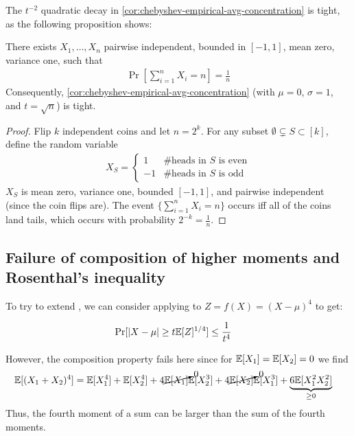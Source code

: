 The $t^{-2}$ quadratic decay in \cref{cor:chebyshev-empirical-avg-concentration} is tight, as the following
proposition shows:
\begin{proposition}
    There exists $X_1, \ldots, X_n$ pairwise independent, bounded in $[-1, 1]$, mean zero, variance one, such that
    \begin{align}
        \Pr\left[\sum_{i=1}^n X_i = n \right] = \frac{1}{n}
    \end{align}
    Consequently, \cref{cor:chebyshev-empirical-avg-concentration} (with $\mu=0$, $\sigma=1$, and $t = \sqrt{n}$)
    is tight.
\end{proposition}
\begin{proof}
    Flip $k$ independent coins and let $n = 2^k$. For any subset $\emptyset \subsetneq S \subset [k]$, define the random variable
    \begin{align}
        X_S = \begin{cases}
            1 &\text{\# heads in $S$ is even} \\
            -1 &\text{\# heads in $S$ is odd}
        \end{cases}
    \end{align}
    $X_S$ is mean zero, variance one, bounded $[-1,1]$, and pairwise
    independent (since the coin flips are). The event $\{ \sum_{i=1}^n X_i = n \}$
    occurs iff all of the coins land tails, which occurs with probability $2^{-k} = \frac{1}{n}$.
\end{proof}

\subsection{Failure of composition of higher moments and Rosenthal's inequality}\label{ssec:rosenthals-inequality}

To try to extend , we can consider applying  to
$Z = f(X) = (X - \mu)^4$ to get:
\begin{theorem}
    \begin{align}
        \Pr[\lvert X - \mu\rvert \geq t \mathbb{E}[Z]^{1/4} ] &\leq \frac{1}{t^4}
    \end{align}
\end{theorem}
However, the composition property fails here since
for $\mathbb{E}[X_1] = \mathbb{E}[X_2] = 0$ we find
\begin{align}
    \mathbb{E}[(X_1 + X_2)^4]
    &= \mathbb{E}[X_1^4] + \mathbb{E}[X_2^4]
    + 4 \cancelto{0}{\mathbb{E}[X_1]} \mathbb{E}[X_2^3]
    + 4 \cancelto{0}{\mathbb{E}[X_2]} \mathbb{E}[X_1^3]
    + \underbrace{6 \mathbb{E}[X_1^2 X_2^2]}_{\geq 0}\label{eq:9-5-4th-moment-nonadditive}
\end{align}
Thus, the fourth moment of a sum can be larger than the sum of the fourth moments.


